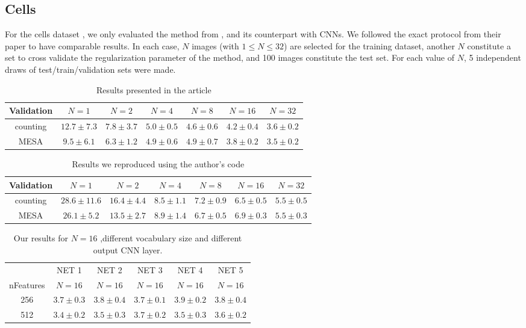 \documentclass[a4paper,11pt, french]{article}
\begin{document}
\subsection*{Cells}
For the cells dataset \cite{basepaper}, we only evaluated the method from \cite{basepaper}, and its counterpart with CNNs. We followed the exact protocol from their paper to have comparable results. In each case, $N$ images (with $1 \leq N \leq 32$) are selected for the training dataset, another $N$ constitute a set to cross validate the regularization parameter of the method, and 100 images constitute the test set. For each value of $N$, 5 independent draws of test/train/validation sets were made.


\begin{table}[H]
\centering
    \begin{tabular}{|c|c|c|c|c|c|c|}
    \hline
    Validation & $N=1$ & $N=2$ & $N=4$ & $N=8$ & $N=16$ & $N=32$ \\ \hline
    counting & $12.7 \pm 7.3$ & $7.8 \pm 3.7$ & $5.0 \pm 0.5$ & $4.6 \pm 0.6$ & $4.2 \pm 0.4$ & $3.6 \pm 0.2$ \\ \hline
    MESA & $9.5 \pm 6.1$ & $6.3 \pm 1.2$ & $4.9 \pm 0.6$ & $4.9 \pm 0.7$ & $3.8 \pm 0.2$ & $3.5 \pm 0.2$ \\ \hline
    \end{tabular}
  \label{lempitskcell}
  \caption{Results presented in the article \cite{basepaper}}
\end{table}

\vspace{-0.5cm}
\begin{table}[H]
\centering
  \begin{tabular}{|c|c|c|c|c|c|c|}
  \hline
  Validation & $N=1$ & $N=2$ & $N=4$ & $N=8$ & $N=16$ & $N=32$ \\ \hline
  counting & $28.6 \pm 11.6$ & $16.4 \pm 4.4$ & $8.5 \pm 1.1$ & $7.2 \pm 0.9$ & $6.5 \pm 0.5$ & $5.5 \pm 0.5$ \\ \hline
  MESA & $26.1 \pm 5.2$ & $13.5 \pm 2.7$ & $8.9 \pm 1.4$ & $6.7 \pm 0.5$ & $6.9 \pm 0.3$ & $5.5 \pm 0.3$ \\ \hline
  \end{tabular}
  \label{lempitskcellour}
  \caption{Results we reproduced using the author's code}
\end{table}

\vspace{-0.5cm}
\begin{table}[H]
  \centering
  \begin{tabular}{|c|c|c|c|c|c|}
  \hline
  & NET 1 & NET 2 & NET 3 & NET 4 & NET 5 \\
  nFeatures & $N=16$ & $N=16$ & $N=16$ & $N=16$ & $N=16$  \\ \hline
  256 & $3.7 \pm 0.3$ & $3.8 \pm 0.4$ & $3.7 \pm 0.1$ & $3.9 \pm 0.2$ & $3.8 \pm 0.4$ \\ \hline
  512 & $3.4 \pm 0.2$ & $3.5 \pm 0.3$ & $3.7 \pm 0.2$ & $3.5 \pm 0.3$ & $3.6 \pm 0.2$ \\ \hline
  \end{tabular}
  \label{cnncell}
  \caption{Our results for $N=16$ ,different vocabulary size and different output CNN layer. }
\end{table}
\end{document}
